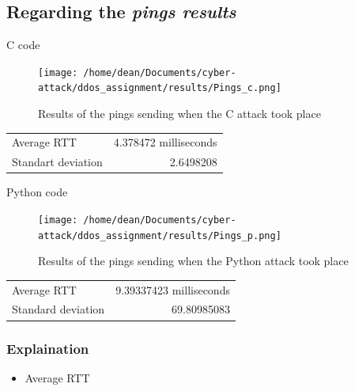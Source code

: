 \documentclass[11pt]{article}
\begin{document}
\subsection{Regarding the \emph{pings results}}
\label{sec:orgebac00a}
\begin{description}
\item[{C code}] 
\end{description}
\begin{figure}[htbp]
\centering
\texttt{[image: /home/dean/Documents/cyber-attack/ddos\_assignment/results/Pings\_c.png]}
\caption{Results of the pings sending when the C attack took place}
\end{figure}
\begin{center}
\begin{tabular}{lr}
Average RTT & 4.378472 milliseconds\\
Standart deviation & 2.6498208\\
\end{tabular}
\end{center}

\begin{description}
\item[{Python code}] 
\end{description}
\begin{figure}[htbp]
\centering
\texttt{[image: /home/dean/Documents/cyber-attack/ddos\_assignment/results/Pings\_p.png]}
\caption{Results of the pings sending when the Python attack took place}
\end{figure}
\begin{center}
\begin{tabular}{lr}
Average RTT & 9.39337423 milliseconds\\
Standard deviation & 69.80985083\\
\end{tabular}
\end{center}
\subsubsection{Explaination}
\label{sec:org728755e}
\begin{itemize}
\item Average RTT
\end{itemize}
\end{document}
